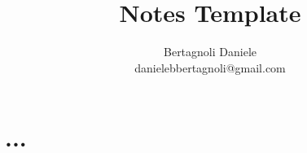 \documentclass[12pt]{article}
\title{Notes Template}
\author{Bertagnoli Daniele \\ danielebbertagnoli@gmail.com}
\date{}
\begin{document}
\maketitle

\section{...}
\end{document}
